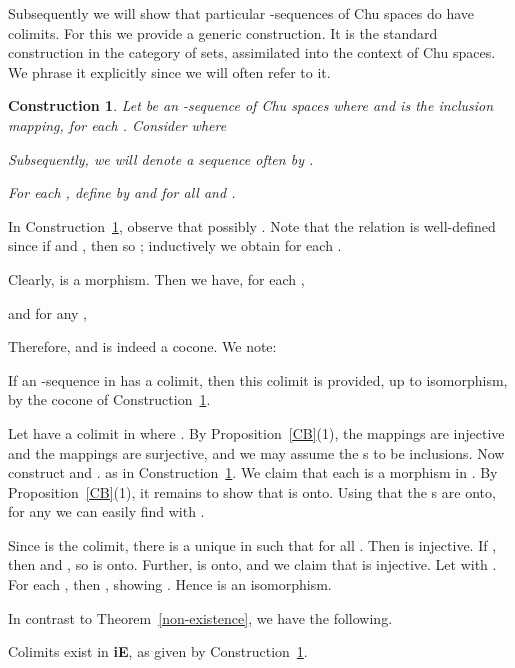 \documentclass{LMCS}
\let\pf\proof
\let\epf\endproof
\newtheorem{const}[thm]{Construction}
\begin{document}
Subsequently we will show that particular -sequences of Chu
spaces do have colimits. For this we provide a generic
construction. It is the standard construction in the category of sets,
assimilated into the context of Chu spaces. We phrase it explicitly
since we will often refer to it.

\begin{const}\label{const:colimit}
  Let  be an -sequence of
  Chu spaces where  and  is the inclusion mapping, for each .
  Consider  where
  

  \noindent Subsequently, we will denote a sequence  often by .

  For each , define  by
   and  for all
   and .
\end{const}

In Construction~\ref{const:colimit}, observe that possibly . Note that the relation  is well-defined since if  and , then  so
; inductively we obtain  for each .

Clearly,  is a morphism.  Then we have, for each ,
  
  and for any ,
  
  Therefore,  and  is indeed a cocone.  We note:

\begin{prop}
  If an -sequence  in  has a colimit, then this colimit is provided, up to
  isomorphism, by the cocone  of Construction~\ref{const:colimit}.
\end{prop}

\pf
Let  have a colimit  in  where . By Proposition~\ref{CB}(1), the mappings 
are injective and the mappings  are surjective, and we
may assume the s to be inclusions. Now construct  and . as in
Construction~\ref{const:colimit}. We claim that each   is a morphism in . By Proposition~\ref{CB}(1), it
remains to show that  is onto. Using that the
s are onto, for any  we can easily find
 with .

Since  is the colimit, there is a unique  in  such that  for
all . Then  is injective. If 
, then  and
, so  is onto. Further, 
is onto, and we claim that  is injective. Let  with .  For
each , then , showing . Hence
 is an isomorphism. \epf

In contrast to Theorem~\ref{non-existence}, we have the following.

\begin{thm}\label{limit-thm}
  Colimits exist in {\bf iE}, as given by Construction~\ref{const:colimit}.
\end{thm}
\end{document}
